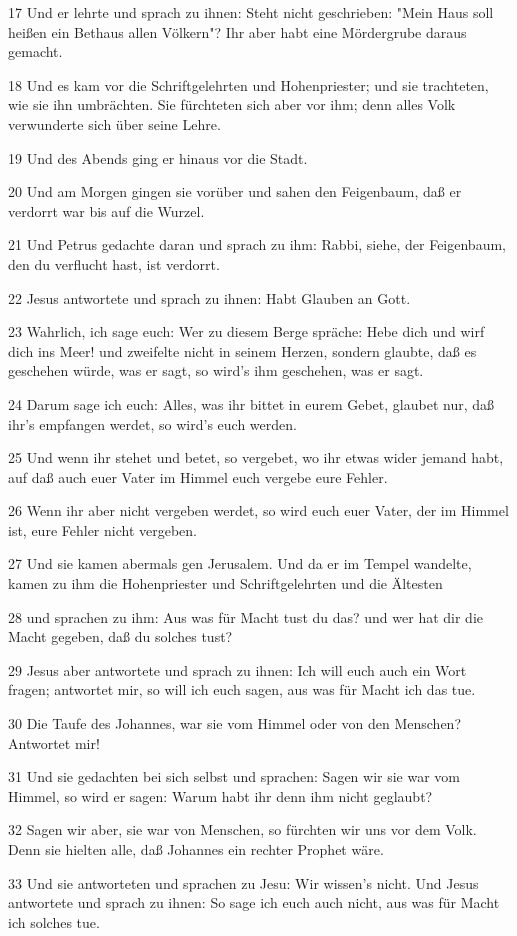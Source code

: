 \par 17 Und er lehrte und sprach zu ihnen: Steht nicht geschrieben: "Mein Haus soll heißen ein Bethaus allen Völkern"? Ihr aber habt eine Mördergrube daraus gemacht.
\par 18 Und es kam vor die Schriftgelehrten und Hohenpriester; und sie trachteten, wie sie ihn umbrächten. Sie fürchteten sich aber vor ihm; denn alles Volk verwunderte sich über seine Lehre.
\par 19 Und des Abends ging er hinaus vor die Stadt.
\par 20 Und am Morgen gingen sie vorüber und sahen den Feigenbaum, daß er verdorrt war bis auf die Wurzel.
\par 21 Und Petrus gedachte daran und sprach zu ihm: Rabbi, siehe, der Feigenbaum, den du verflucht hast, ist verdorrt.
\par 22 Jesus antwortete und sprach zu ihnen: Habt Glauben an Gott.
\par 23 Wahrlich, ich sage euch: Wer zu diesem Berge spräche: Hebe dich und wirf dich ins Meer! und zweifelte nicht in seinem Herzen, sondern glaubte, daß es geschehen würde, was er sagt, so wird's ihm geschehen, was er sagt.
\par 24 Darum sage ich euch: Alles, was ihr bittet in eurem Gebet, glaubet nur, daß ihr's empfangen werdet, so wird's euch werden.
\par 25 Und wenn ihr stehet und betet, so vergebet, wo ihr etwas wider jemand habt, auf daß auch euer Vater im Himmel euch vergebe eure Fehler.
\par 26 Wenn ihr aber nicht vergeben werdet, so wird euch euer Vater, der im Himmel ist, eure Fehler nicht vergeben.
\par 27 Und sie kamen abermals gen Jerusalem. Und da er im Tempel wandelte, kamen zu ihm die Hohenpriester und Schriftgelehrten und die Ältesten
\par 28 und sprachen zu ihm: Aus was für Macht tust du das? und wer hat dir die Macht gegeben, daß du solches tust?
\par 29 Jesus aber antwortete und sprach zu ihnen: Ich will euch auch ein Wort fragen; antwortet mir, so will ich euch sagen, aus was für Macht ich das tue.
\par 30 Die Taufe des Johannes, war sie vom Himmel oder von den Menschen? Antwortet mir!
\par 31 Und sie gedachten bei sich selbst und sprachen: Sagen wir sie war vom Himmel, so wird er sagen: Warum habt ihr denn ihm nicht geglaubt?
\par 32 Sagen wir aber, sie war von Menschen, so fürchten wir uns vor dem Volk. Denn sie hielten alle, daß Johannes ein rechter Prophet wäre.
\par 33 Und sie antworteten und sprachen zu Jesu: Wir wissen's nicht. Und Jesus antwortete und sprach zu ihnen: So sage ich euch auch nicht, aus was für Macht ich solches tue.


